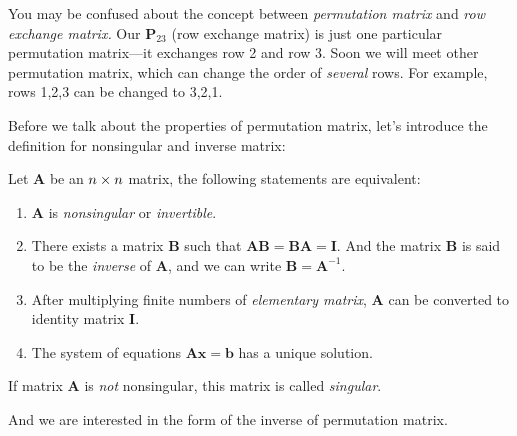 \begin{remark}
You may be confused about the concept between \textit{permutation matrix} and \textit{row exchange matrix.} Our $\bm P_{23}$ (row exchange matrix) is just one particular permutation matrix---it exchanges
row 2 and row 3. Soon we will meet other permutation matrix, which can change the order of \emph{several} rows. For example, rows 1,2,3 can be changed to 3,2,1.
\end{remark}
Before we talk about the properties of permutation matrix, let’s introduce the definition for
nonsingular and inverse matrix:
\begin{definition}
Let $\bm A$ be an $n\times n$ matrix, the following statements are equivalent:
\begin{enumerate}
\item
$\bm A$ is \emph{nonsingular} or \emph{invertible}.
\item
There exists a matrix $\bm B$ such that $\bm{AB}=\bm{BA}=\bm I$. And the matrix $\bm B$ is said to be the \emph{inverse} of $\bm A$, and we can write $\bm B=\bm A^{-1}.$
\item
After multiplying finite numbers of \emph{elementary matrix}, $\bm A$ can be converted to identity matrix $\bm I.$
\item
The system of equations $\bm{Ax}=\bm b$ has a unique solution.
\end{enumerate}
If matrix $\bm A$ is \emph{not} nonsingular, this matrix is called \emph{singular}.
\end{definition}
And we are interested in the form of the inverse of permutation matrix.
